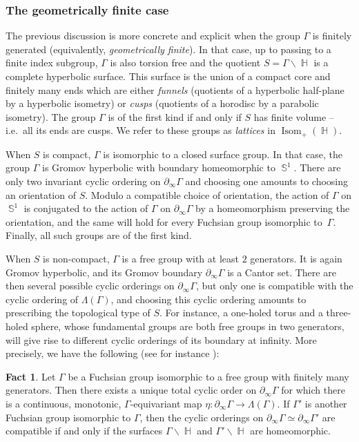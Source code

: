 \documentclass{amsart}
\theoremstyle{plain}
\theoremstyle{definition}
\newtheorem{fact}[proposition]{Fact}
\DeclareMathOperator{\Isom}{Isom}
\DeclareMathOperator{\Hb}{\mathbb{H}}
\DeclareMathOperator{\Sb}{\mathbb{S}}
\newcommand{\1}{\mathbf{1}}
\begin{document}
\subsubsection{The geometrically finite case}
The previous discussion is more concrete and explicit when the group $\Gamma$ is finitely generated (equivalently, \emph{geometrically finite}). In that case, up to passing to a finite index subgroup, $\Gamma$ is also torsion free and the quotient $S = \Gamma \backslash \Hb$ is a complete hyperbolic surface. This surface is the union of a compact core and finitely many ends which are either \emph{funnels} (quotients of a hyperbolic half-plane by a hyperbolic isometry) or \emph{cusps} (quotients of a horodisc by a parabolic isometry). The group $\Gamma$ is of the first kind if and only if $S$ has finite volume -- i.e.\ all its ends are cusps. We refer to these groups as \emph{lattices} in $\Isom_+(\Hb)$.

When $S$ is compact, $\Gamma$ is isomorphic to a closed surface group. In that case, the group $\Gamma$ is Gromov hyperbolic with boundary homeomorphic to $\Sb^1$. There are only two invariant cyclic ordering on $\partial_\infty \Gamma$ and choosing one amounts to choosing an orientation of $S$. Modulo a compatible choice of orientation, the action of $\Gamma$ on $\Sb^1$ is conjugated to the action of $\Gamma$ on $\partial_\infty \Gamma$ by a homeomorphism preserving the orientation, and the same will hold for every Fuchsian group isomorphic to~$\Gamma$. Finally, all such groups are of the first kind.

When $S$ is non-compact, $\Gamma$ is a free group with at least $2$ generators. It is again Gromov hyperbolic, and its Gromov boundary $\partial_\infty \Gamma$ is a Cantor set. There are then several possible cyclic orderings on $\partial_\infty \Gamma$, but only one is compatible with the cyclic ordering of $\Lambda(\Gamma)$, and choosing this cyclic ordering amounts to prescribing the topological type of $S$. For instance, a one-holed torus and a three-holed sphere, whose fundamental groups are both free groups in two generators, will give rise to different cyclic orderings of its boundary at infinity. More precisely, we have the following (see for instance \cite{Katok}):

\begin{fact}
    Let $\Gamma$ be a Fuchsian group isomorphic to a free group with finitely many generators. Then there exists a unique total cyclic order on $\partial_\infty \Gamma$ for which there is a continuous, monotonic, $\Gamma$-equivariant map $\eta: \partial_\infty \Gamma \to \Lambda(\Gamma)$. If $\Gamma'$ is another Fuchsian group isomorphic to $\Gamma$, then the cyclic orderings on $\partial_\infty \Gamma \simeq \partial_\infty \Gamma'$ are compatible if and only if the surfaces $\Gamma \backslash \Hb$ and $\Gamma'\backslash \Hb$ are homeomorphic. 
\end{fact}
\end{document}
